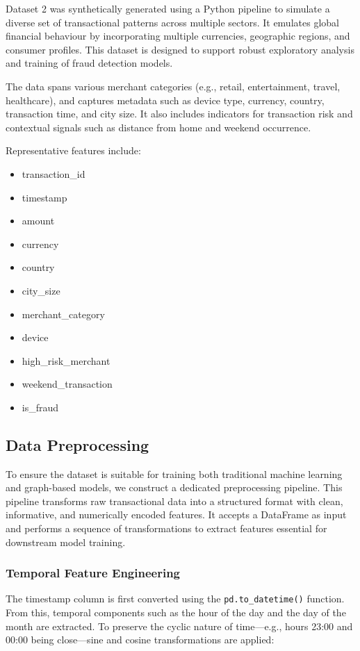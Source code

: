\documentclass[conference]{IEEEtran}
\begin{document}
Dataset 2 was synthetically generated using a Python pipeline \cite{data_generation} to simulate a diverse set of transactional patterns across multiple sectors. It emulates global financial behaviour by incorporating multiple currencies, geographic regions, and consumer profiles. This dataset is designed to support robust exploratory analysis and training of fraud detection models.

The data spans various merchant categories (e.g., retail, entertainment, travel, healthcare), and captures metadata such as device type, currency, country, transaction time, and city size. It also includes indicators for transaction risk and contextual signals such as distance from home and weekend occurrence.

Representative features include:
\begin{itemize}
    \item transaction\_id
    \item timestamp
    \item amount
    \item currency
    \item country
    \item city\_size
    \item merchant\_category
    \item device
    \item high\_risk\_merchant
    \item weekend\_transaction
    \item is\_fraud
\end{itemize}


\subsection{Data Preprocessing}

To ensure the dataset is suitable for training both traditional machine learning and graph-based models, we construct a dedicated preprocessing pipeline. This pipeline transforms raw transactional data into a structured format with clean, informative, and numerically encoded features. It accepts a DataFrame as input and performs a sequence of transformations to extract features essential for downstream model training.

\subsubsection{Temporal Feature Engineering}

The timestamp column is first converted using the \texttt{pd.to\_datetime()} function. From this, temporal components such as the hour of the day and the day of the month are extracted. To preserve the cyclic nature of time—e.g., hours 23:00 and 00:00 being close—sine and cosine transformations are applied:
\end{document}
